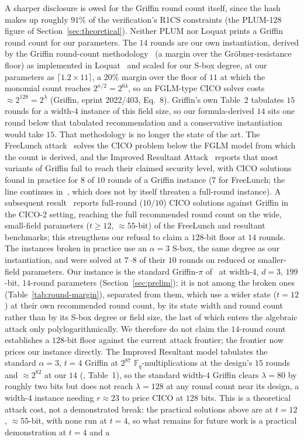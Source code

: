 A sharper disclosure is owed for the Griffin round count itself, since the hash makes up roughly $91\%$ of the verification's R1CS constraints (the PLUM-128 figure of Section~\ref{sec:theoretical}). Neither PLUM nor Loquat prints a Griffin round count for our parameters. The $14$ rounds are our own instantiation, derived by the Griffin round-count methodology~\cite{cryptoeprint:2022/403} (a margin over the Gr\"{o}bner-resistance floor) as implemented in Loquat~\cite{cryptoeprint:2024/868} and scaled for our S-box degree, at our parameters as $\lceil 1.2\times 11\rceil$, a $20\%$ margin over the floor of $11$ at which the monomial count reaches $2^{\kappa/2}=2^{64}$, so an FGLM-type CICO solver costs $\approx 2^{128}=2^{\lambda}$ (Griffin, eprint 2022/403, Eq.~8). Griffin's own Table~2 tabulates $15$ rounds for a width-$4$ instance of this field size, so our formula-derived $14$ sits one round below that tabulated recommendation and a conservative instantiation would take $15$. That methodology is no longer the state of the art. The FreeLunch attack~\cite{freelunch2024} solves the CICO problem below the FGLM model from which the count is derived, and the Improved Resultant Attack~\cite{resultant2025} reports that most variants of Griffin fail to reach their claimed security level, with CICO solutions found in practice for $8$ of $10$ rounds of a Griffin instance ($7$ for FreeLunch; the line continues in~\cite{cheaplunch2025}, which does not by itself threaten a full-round instance). A subsequent result~\cite{bak2026resultants} reports full-round ($10/10$) CICO solutions against Griffin in the {CICO}-2 setting, reaching the full recommended round count on the wide, small-field parameters ($t\ge 12$, ${\approx}55$-bit) of the FreeLunch and resultant benchmarks; this strengthens our refusal to claim a $128$-bit floor at $14$ rounds. The instances broken in practice use an $\alpha=3$ S-box, the same degree as our instantiation, and were solved at $7$--$8$ of their $10$ rounds on reduced or smaller-field parameters. Our instance is the standard Griffin-$\pi$ of~\cite{cryptoeprint:2022/403} at width-$4$, $d{=}3$, $199$-bit, $14$-round parameters (Section~\ref{sec:prelim}); it is not among the broken ones (Table~\ref{tab:round-margin}), separated from them, which use a wider state ($t{=}12$) at their own recommended round count, by its state width and round count rather than by its S-box degree or field size, the last of which enters the algebraic attack only polylogarithmically. We therefore do not claim the $14$-round count establishes a $128$-bit floor against the current attack frontier; the frontier now prices our instance directly. The Improved Resultant model tabulates the standard $\alpha=3$, $t=4$ Griffin at $2^{87}$ $\mathbb{F}_q$-multiplications at the design's $15$ rounds and $\approx 2^{82}$ at our $14$ (\cite{resultant2025}, Table~1), so the standard width-$4$ Griffin clears $\lambda=80$ by roughly two bits but does not reach $\lambda=128$ at any round count near its design, a width-$4$ instance needing $r\approx 23$ to price CICO at $128$ bits. This is a theoretical attack cost, not a demonstrated break: the practical solutions above are at $t=12$, ${\approx}55$-bit, with none run at $t=4$, so what remains for future work is a practical demonstration at $t=4$ and a 